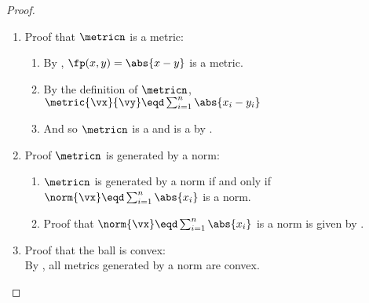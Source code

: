 \begin{proof}
\begin{enumerate}
  \item Proof that $\metricn$ is a metric:
    \begin{enumerate}
      \item By , $\fp(x,y)=\abs{x-y}$ is a metric.
      \item By the definition of $\metricn$, 
            $\metric{\vx}{\vy} \eqd \sum_{i=1}^n \abs{x_i-y_i}$
      \item And so $\metricn$ is a  and is a  by .
    \end{enumerate}

  \item Proof $\metricn$ is generated by a norm: 
    \begin{enumerate}
      \item $\metricn$ is generated by a norm if and only if
            $\norm{\vx}\eqd\sum_{i=1}^n \abs{x_i}$ is a norm.
      \item Proof that $\norm{\vx}\eqd\sum_{i=1}^n \abs{x_i}$ is a norm
            is given by .
    \end{enumerate}

  \item Proof that the ball is convex: \\
    By , all metrics generated by a norm are convex.
\end{enumerate}
\end{proof}






